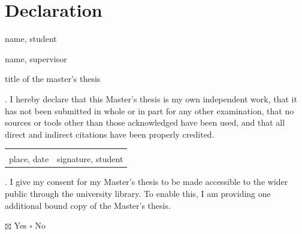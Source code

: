 
\chapter*{Declaration}
\thispagestyle{empty}

\noindent
name, student\\
\thesisAuthor

\vspace{0.4cm}
\noindent
name, supervisor\\
\thesisSupervisorDIT

\vspace{0.4cm}
\noindent
title of the master's thesis\\
\thesisTitle

\vspace{0.7cm}
. I hereby declare that this Master's thesis is my own independent
work, that it has not been submitted in whole or in part for any
other examination, that no sources or tools other than those
acknowledged have been used, and that all direct and indirect
citations have been properly credited.

\vspace{1cm}
\noindent
\begin{tabular}{@{}p{6cm}p{6cm}@{}}
\hrulefill & \hrulefill \\
place, date & signature, student \\
\end{tabular}

\vspace{1cm}
. I give my consent for my Master's thesis to be made accessible to
the wider public through the university library. To enable this, I am
providing one additional bound copy of the Master's thesis.

\vspace{0.3cm}
\noindent $\boxtimes$ Yes \hspace{2cm} $\square$ No

